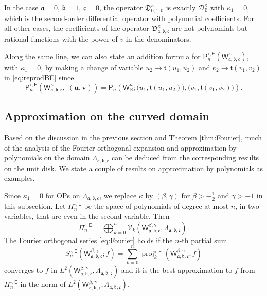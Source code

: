 \documentclass{amsart}
\theoremstyle{remark}
\def\sE{{\mathsf E}}
\def\sP{{\mathsf P}}
\def\sW{{\mathsf W}}
\def\fa{{\mathfrak a}}
\def\fb{{\mathfrak b}}
\def\fc{{\mathfrak c}}
\def\ft{{\mathfrak t}}
\def\fD{{\mathfrak D}}
\def\b{{\beta}}
\def\g{{\gamma}}
\def\k{{\kappa}}
\def\ub{{\mathbf u}}
\def\vb{{\mathbf v}}
\def\CD{{\mathcal D}}
\def\CV{{\mathcal V}}
\def\BB{{\mathbb B}}
\def\proj{\operatorname{proj}}
\def\f{\frac}
\begin{document}
In the case $\fa = 0, \, \fb=1, \,\fc=0$, the operator $\fD_{0,1,0}^\k$ is exactly $\CD_\BB^\k$ with $\k_1=0$,
which is the second-order differential operator with polynomial coefficients. For all other cases, the 
coefficients of the operator $\fD_{\fa,\fb,\fc}^\k$ are not polynomials but rational functions with the power
of $v$ in the denominators. 

Along the same line, we can also state an addition formula for $\sP_n^{\circ,\sE}(\sW_{\fa,\fb,\fc}^\k)$, with $\k_1=0$,
by making a change of variable $u_2 \to \ft(u_1,u_2)$ and $v_2 \to \ft(v_1,v_2)$ in \eqref{eq:reprodBE} since
$$
\sP_n^{\circ,\sE}\left(\sW_{\fa,\fb,\fc}^\k,\; (\ub,\vb)\right) = \sP_n\left(\sW_\BB^\k; \big(u_1, \ft(u_1,u_2)\big),
   \big(v_1, \ft(v_1,v_2)\big) \right). 
$$
 
\subsection{Approximation on the curved domain}
Based on the discussion in the previous section and Theorem \ref{thm:Fourier}, much of the analysis 
of the Fourier orthogonal expansion and approximation by polynomials on the domain $\Lambda_{\fa,\fb,\fc}$
can be deduced from the corresponding results on the unit disk. We state a couple of results on approximation
by polynomials as examples. 

Since $\k_1 = 0$ for OPs on $\Lambda_{\fa,\fb,\fc}$, we replace $\k$ by $(\b,\g)$ for $\b > -\f12$ and $\g > -1$ in 
this subsection. Let $\Pi_n^{\circ,\sE}$ be the space of polynomials of degree at most $n$, in two variables, 
that are even in the second variable. Then 
$$
   \Pi_n^{\circ,\sE} = \bigoplus_{k=0}^n \CV_k(\sW_{\fa, \fb, \fc}^{\b,\g},\Lambda_{\fa, \fb, \fc}). 
$$
The Fourier orthogonal series \eqref{eq:Fourier} holds if the $n$-th partial sum 
$$
  S_n^{\circ,\sE} (\sW_{\fa, \fb, \fc}^{\b,\g}; f) = \sum_{k=0}^n \proj_k^{\circ,\sE} (\sW_{\fa, \fb, \fc}^{\b,\g}; f)
$$
converges to $f$ in $L^2(\sW_{\fa, \fb, \fc}^{\b,\g},\Lambda_{\fa, \fb, \fc})$ and it is the best approximation to 
$f$ from $\Pi_n^{\circ,\sE}$ in the norm of $L^2(\sW_{\fa, \fb, \fc}^{\b,\g},\Lambda_{\fa, \fb, \fc})$. 
\end{document}
